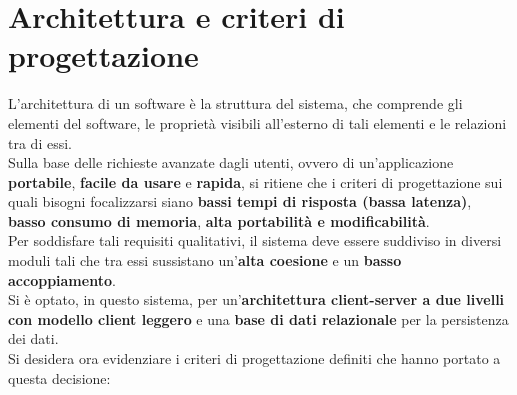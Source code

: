     \section{Architettura e criteri di progettazione}
        L'architettura di un software è la struttura del sistema, che comprende gli elementi del software, le proprietà visibili all'esterno di tali elementi e le relazioni tra di essi. \\
        Sulla base delle richieste avanzate dagli utenti, ovvero di un’applicazione \textbf{portabile}, \textbf{facile da usare} e \textbf{rapida}, si ritiene che i criteri di progettazione sui quali bisogni focalizzarsi siano \textbf{bassi tempi di risposta (bassa latenza)}, \textbf{basso consumo di memoria}, \textbf{alta portabilità e modificabilità}. \\
        Per soddisfare tali requisiti qualitativi, il sistema deve essere suddiviso in diversi moduli tali che tra essi sussistano un'\textbf{alta coesione} e un \textbf{basso accoppiamento}. \\
        Si è optato, in questo sistema, per un'\textbf{architettura client-server a due livelli con modello client leggero} e una \textbf{base di dati relazionale} per la persistenza dei dati. \\
        Si desidera ora evidenziare i criteri di progettazione definiti che hanno portato a questa decisione:

